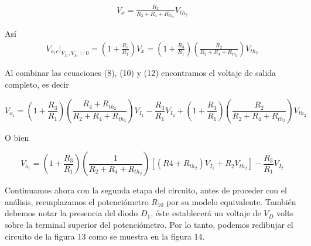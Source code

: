 \documentclass{article}
\begin{document}
\begin{align}
	V_x = \frac{R_2}{R_2 + R_4 + R_{th_2}}V_{th_2}
\end{align}

Así
\begin{align}
	V_{o_1c} \bigg\rvert_{V_{I_1}, V_{I_2} = 0} =  \left( 1 + \frac{R_3}{R_1} \right) V_x = \left( 1 + \frac{R_3}{R_1} \right) \left( \frac{R_2}{R_2 + R_4 + R_{th_2}} \right)V_{th_2}
\end{align}


Al combinar las ecuaciones (8), (10) y (12) encontramos el voltaje de salida completo, es decir


\begin{tcolorbox}[colback=red!5!white,colframe=red!75!black,arc=0mm,boxrule=0mm,width=(\linewidth+0.5cm)]
	\begin{equation}
		V_{o_1} = \left( 1 + \frac{R_3}{R_1} \right) \left( \frac{R_4 + R_{th_2}}{R_2 + R_4 + R_{th_2}} \right)V_{I_1} -\frac{R_3}{R_1}V_{I_2} + \left( 1 + \frac{R_3}{R_1} \right) \left( \frac{R_2}{R_2 + R_4 + R_{th_2}} \right)V_{th_2}
	\end{equation}
\end{tcolorbox}

O bien
\begin{tcolorbox}[colback=red!5!white,colframe=red!75!black,arc=0mm,boxrule=0mm,width=(\linewidth+0.5cm)]
	\begin{equation}
		V_{o_1} = \left( 1 + \frac{R_3}{R_1} \right) \left( \frac{1}{R_2 + R_4 + R_{th_2}} \right) \left[ (R4 + R_{th_2})V_{I_1} + R_2V_{th_2} \right] - \frac{R_3}{R_1} V_{I_2}
	\end{equation}
\end{tcolorbox}


Continuamos ahora con la segunda etapa del circuito, antes de proceder con el análisis, reemplazamos el potenciómetro $R_{10}$ por su modelo equivalente. También debemos notar la presencia del diodo $D_1$, éste establecerá un voltaje de $V_D$ volts sobre la terminal superior del potenciómetro. Por lo tanto, podemos redibujar el circuito de la figura 13 como se muestra en la figura 14.
\end{document}

